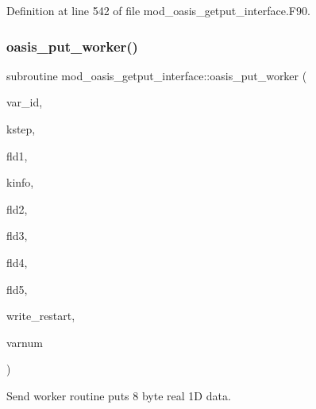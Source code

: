 Definition at line 542 of file mod\+\_\+oasis\+\_\+getput\+\_\+interface.\+F90.

\mbox{\label{namespacemod__oasis__getput__interface_a13fcf0d2a7c31cfbbb24087d24c4f851}} 
\subsubsection{\texorpdfstring{oasis\+\_\+put\+\_\+worker()}{oasis\_put\_worker()}}
{\footnotesize\ttfamily subroutine mod\+\_\+oasis\+\_\+getput\+\_\+interface\+::oasis\+\_\+put\+\_\+worker (\begin{DoxyParamCaption}\item[{integer(kind=ip\+\_\+i4\+\_\+p), intent(in)}]{var\+\_\+id,  }\item[{integer(kind=ip\+\_\+i4\+\_\+p), intent(in)}]{kstep,  }\item[{real(kind=ip\+\_\+double\+\_\+p), dimension(\+:)}]{fld1,  }\item[{integer(kind=ip\+\_\+i4\+\_\+p), intent(out)}]{kinfo,  }\item[{real(kind=ip\+\_\+double\+\_\+p), dimension(\+:), optional}]{fld2,  }\item[{real(kind=ip\+\_\+double\+\_\+p), dimension(\+:), optional}]{fld3,  }\item[{real(kind=ip\+\_\+double\+\_\+p), dimension(\+:), optional}]{fld4,  }\item[{real(kind=ip\+\_\+double\+\_\+p), dimension(\+:), optional}]{fld5,  }\item[{logical, optional}]{write\+\_\+restart,  }\item[{integer(kind=ip\+\_\+i4\+\_\+p), optional}]{varnum }\end{DoxyParamCaption})\hspace{0.3cm}{\ttfamily [private]}}



Send worker routine puts 8 byte real 1D data. 


